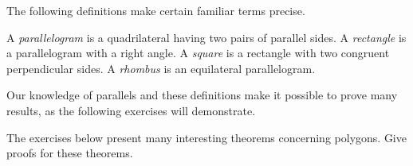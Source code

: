 \documentclass[11pt]{book}
\begin{document}
The following definitions make certain familiar terms precise.

\begin{definition}
A \emph{parallelogram} is a quadrilateral having two pairs of parallel sides.
A \emph{rectangle} is a parallelogram with a right angle. A \emph{square} is a
rectangle with two congruent perpendicular sides. A \emph{rhombus} is an
equilateral parallelogram.
\end{definition}

\FIGVIIITWENTYFIVE

Our knowledge of parallels and these definitions make it possible to prove
many results, as the following exercises will demonstrate.

\noindent The exercises below present many interesting theorems concerning
polygons. Give proofs for these theorems.
\end{document}
